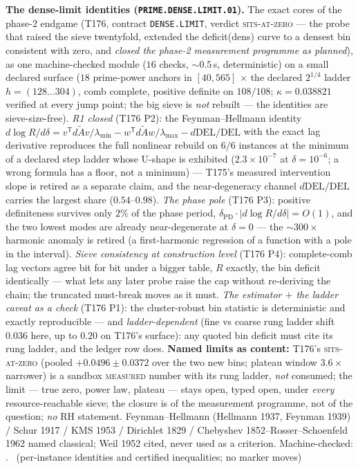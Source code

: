 \documentclass[11pt,a4paper]{article}
\theoremstyle{definition}
\begin{document}
\par\smallskip\noindent\textbf{The dense-limit identities
(\texttt{PRIME.DENSE.LIMIT.01}).}
The exact cores of the phase-2 endgame (T176, contract
\texttt{DENSE.LIMIT}, verdict \textsc{sits-at-zero} --- the probe that
raised the sieve twentyfold, extended the deficit(dens) curve to a
densest bin consistent with zero, and \emph{closed the phase-2
measurement programme as planned}), as one machine-checked module
($16$ checks, ${\sim}0.5$\,s, deterministic) on a small declared
surface ($18$ prime-power anchors in $[40,565]$ $\times$ the declared
$2^{1/4}$ ladder $h=(128\ldots304)$, comb complete, positive definite
on $108/108$; $\kappa=0.038821$ verified at every jump point; the big
sieve is \emph{not} rebuilt --- the identities are sieve-size-free).
\emph{R1 closed} (T176 P2): the Feynman--Hellmann identity
$d\log R/d\delta=v^{\mathsf T}d\tilde Av/\lambda_{\min}
-w^{\mathsf T}d\tilde Aw/\lambda_{\max}-d\mathrm{DEL}/\mathrm{DEL}$
with the exact lag derivative reproduces the full nonlinear rebuild on
$6/6$ instances at the minimum of a declared step ladder whose U-shape
is exhibited ($2.3\times10^{-7}$ at $\delta=10^{-6}$; a wrong formula
has a floor, not a minimum) --- T175's measured intervention slope is
retired as a separate claim, and the near-degeneracy channel
$d\mathrm{DEL}/\mathrm{DEL}$ carries the largest share
($0.54$--$0.98$).
\emph{The phase pole} (T176 P3): positive definiteness survives only
$2\%$ of the phase period, $\delta_{\mathrm{PD}}\cdot|d\log
R/d\delta|=O(1)$, and the two lowest modes are already near-degenerate
at $\delta=0$ --- the ${\sim}300\times$ harmonic anomaly is retired (a
first-harmonic regression of a function with a pole in the interval).
\emph{Sieve consistency at construction level} (T176 P4): complete-comb
lag vectors agree bit for bit under a bigger table, $R$ exactly, the
bin deficit identically --- what lets any later probe raise the cap
without re-deriving the chain; the truncated must-break moves as it
must.
\emph{The estimator $+$ the ladder caveat as a check} (T176 P1): the
cluster-robust bin statistic is deterministic and exactly reproducible
--- and \emph{ladder-dependent} (fine vs coarse rung ladder shift
$0.036$ here, up to $0.20$ on T176's surface): any quoted bin deficit
must cite its rung ladder, and the ledger row does.
\textbf{Named limits as content:} T176's \textsc{sits-at-zero} (pooled
$+0.0496\pm0.0372$ over the two new bins; plateau window $3.6\times$
narrower) is a sandbox \textsc{measured} number with its rung ladder,
\emph{not} consumed; the limit --- true zero, power law, plateau ---
stays open, typed open, under \emph{every} resource-reachable sieve;
the closure is of the measurement programme, not of the question;
\emph{no} RH statement.
Feynman--Hellmann (Hellmann 1937, Feynman 1939) / Schur 1917 / KMS
1953 / Dirichlet 1829 / Chebyshev 1852--Rosser--Schoenfeld 1962 named
classical; Weil 1952 cited, never used as a criterion.
Machine-checked:
.
\mE\ (per-instance identities and certified inequalities; no marker moves)
\end{document}
